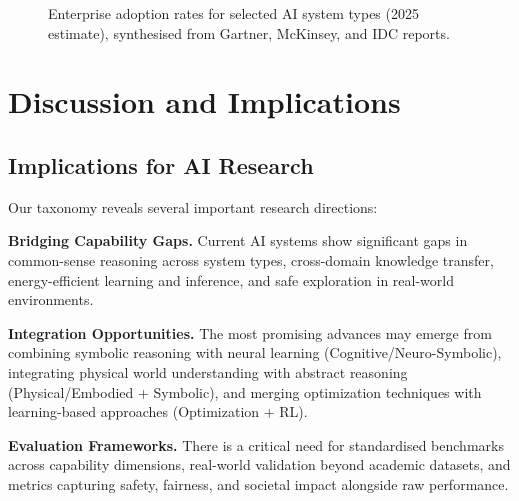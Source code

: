 \documentclass[acmsmall,screen,review]{acmart}
\begin{document}
\begin{figure}[ht]
\centering
{}
\caption{Enterprise adoption rates for selected AI system types (2025 estimate), synthesised from Gartner, McKinsey, and IDC reports.}
\label{fig:adoption}
\end{figure}

\section{Discussion and Implications}

\subsection{Implications for AI Research}
Our taxonomy reveals several important research directions:

\textbf{Bridging Capability Gaps.} Current AI systems show significant gaps in common-sense reasoning across system types, cross-domain knowledge transfer, energy-efficient learning and inference, and safe exploration in real-world environments.

\textbf{Integration Opportunities.} The most promising advances may emerge from combining symbolic reasoning with neural learning (Cognitive/Neuro-Symbolic), integrating physical world understanding with abstract reasoning (Physical/Embodied + Symbolic), and merging optimization techniques with learning-based approaches (Optimization + RL).

\textbf{Evaluation Frameworks.} There is a critical need for standardised benchmarks across capability dimensions, real-world validation beyond academic datasets, and metrics capturing safety, fairness, and societal impact alongside raw performance.
\end{document}

